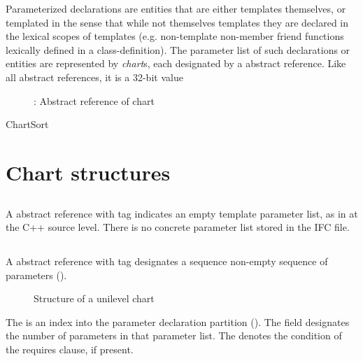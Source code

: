 \label{sec:ifc-charts}


Parameterized declarations are entities that are either templates themselves, or templated in the 
sense that while not themselves templates they are declared in the lexical scopes of templates 
(e.g. non-template non-member friend functions lexically defined in a class-definition).  
The parameter list of such declarations or entities are represented by \emph{chart}s, each 
designated by a  abstract reference.    
Like all abstract references, it is a 32-bit value
\begin{figure}[htbp]
  \centering
  \caption{: Abstract reference of chart}
  \label{fig:ifc-chart-index}
\end{figure}

\begin{SortEnum}{ChartSort}
\end{SortEnum}

\section{Chart structures}
\label{sec:ifc:chart-structures}

\subsection{}
\label{sec:ifc:ChartSort:None}

A  abstract reference with tag  indicates an empty template 
parameter list, as in 
at the C++ source level.  There is no concrete parameter list stored in the IFC file.


\subsection{}
\label{sec:ifc:ChartSort:Unilevel}

A  abstract reference with tag  designates a sequence 
non-empty sequence of parameters ().

\begin{figure}[H]
	\centering
	\caption{Structure of a unilevel chart}
	\label{fig:ifc-unilevel-chart-structure}
\end{figure}
%
The  is an index into the parameter declaration partition ().
The  field designates the number of parameters in that parameter list.
The  denotes the condition of the requires clause, if present.

